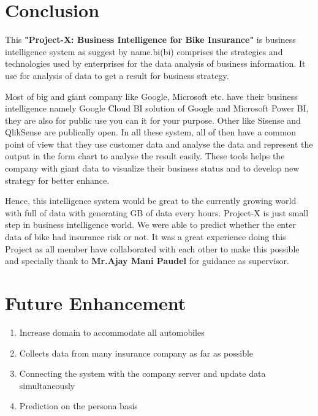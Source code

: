 \section{Conclusion}
\par
This \textbf{"Project-X: Business Intelligence for Bike Insurance"} is business intelligence system as suggest by name.\acl{bi}(\acs{bi}) comprises the strategies and technologies used by enterprises for the data analysis of business information. It use for analysis of data to get a result for business strategy.
\par Most of big and giant company like Google, Microsoft etc. have their business intelligence namely Google Cloud BI solution of Google and Microsoft Power BI, they are also for public use you can it for your purpose. Other like Sisense and QlikSense are publically open. In all these system, all of then have a common point of view that they use customer data and analyse the data and represent the output in the form chart to analyse the result easily. These tools helps the company with giant data to visualize their business status and to develop new strategy for better enhance.
\par 
Hence, this intelligence system would be great to the currently growing world with full of data with generating GB of data every hours. Project-X is just small step in  business intelligence world. We were able to predict whether the enter data of bike had insurance risk or not. It was a great experience doing this Project as all member have collaborated with each other to make this possible and specially thank to \textbf{Mr.Ajay Mani Paudel} for guidance as supervisor.


\section{Future Enhancement}
\begin{enumerate}
\item Increase domain to accommodate  all automobiles 
\item Collects data from many insurance company as far as possible
\item Connecting the system with the company server and update data simultaneously
\item Prediction on  the persona basis
\end{enumerate}

\renewcommand\bibname{References} %




